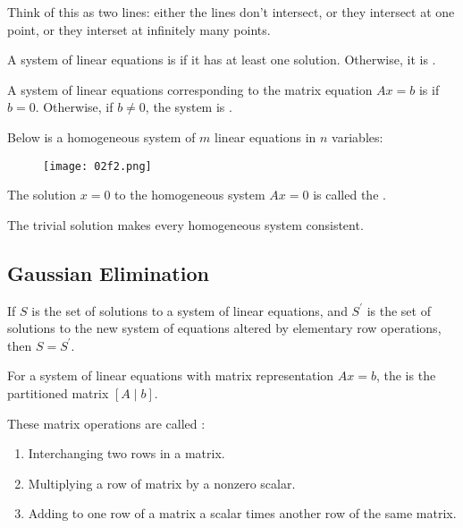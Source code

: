 Think of this as two lines: either the lines don't intersect, or they intersect at one point, or they interset at infinitely many points.

\begin{definition}[Consistency]
  A system of linear equations is  if it has at least one solution.
  Otherwise, it is .
\end{definition}

\begin{definition}[Homogeneity]
  A system of linear equations corresponding to the matrix equation $Ax = b$ is  if $b = 0$.
  Otherwise, if $b \neq 0$, the system is .
\end{definition}

Below is a homogeneous system of $m$ linear equations in $n$ variables:
\begin{figure}[H]
  \centering
  \texttt{[image: 02f2.png]}
\end{figure}

\begin{definition}
  The solution $x = 0$ to the homogeneous system $Ax = 0$ is called the .
\end{definition}

The trivial solution makes every homogeneous system consistent.

\subsection{Gaussian Elimination}
If $S$ is the set of solutions to a system of linear equations, and $S^{\prime}$ is the set of solutions to the new 
system of equations altered by elementary row operations, then $S = S^{\prime}$.

\begin{definition}
  For a system of linear equations with matrix representation $Ax = b$, the 
  is the partitioned matrix $\left[A \mid b\right]$.
\end{definition}

\begin{definition}
  These matrix operations are called :
  \begin{enumerate}[R1.]
    \item Interchanging two rows in a matrix.
    \item Multiplying a row of matrix by a nonzero scalar.
    \item Adding to one row of a matrix a scalar times another row of the same matrix.
  \end{enumerate}
\end{definition}

